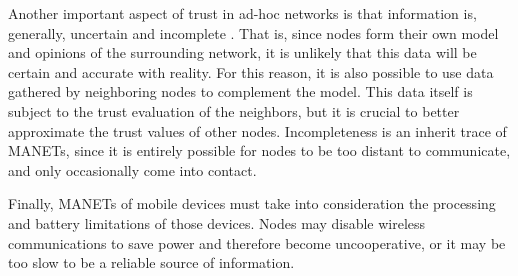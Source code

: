 Another important aspect of trust in ad-hoc networks is that information is, generally, uncertain and incomplete \cite{baras2005cooperation}.
That is, since nodes form their own model and opinions of the surrounding network, it is unlikely that this data will be certain and accurate with reality.
For this reason, it is also possible to use data gathered by neighboring nodes to complement the model.
This data itself is subject to the trust evaluation of the neighbors, but it is crucial to better approximate the trust values of other nodes.
Incompleteness is an inherit trace of MANETs, since it is entirely possible for nodes to be too distant to communicate, and only occasionally come into contact.

Finally, MANETs of mobile devices must take into consideration the processing and battery limitations of those devices.
Nodes may disable wireless communications to save power and therefore become uncooperative, or it may be too slow to be a reliable source of information.

